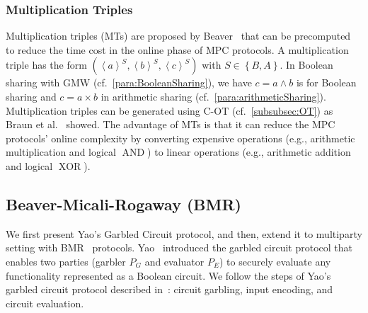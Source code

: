 \subsubsection{Multiplication Triples}
\label{subsubsec:MTs}
Multiplication triples (MTs) are proposed by Beaver~\cite{beaver1991efficient} that can be precomputed to reduce the time cost in the online phase of MPC protocols.
A multiplication triple has the form $\left(\left\langle a\right\rangle^S , \left\langle b\right\rangle^S,\left\langle c\right\rangle^S\right) $ with $S\in \left\{B,A\right\} $.
In Boolean sharing with GMW (cf.~\autoref{para:BooleanSharing}), we have $c=a\land b$ is for Boolean sharing  and $c=a \times  b$ in arithmetic sharing (cf.~\autoref{para:arithmeticSharing}).
Multiplication triples can be generated using C-OT (cf.~\autoref{subsubsec:OT}) as Braun et al.~\cite{DSZ15,braun2020motion} showed.
The advantage of MTs is that it can reduce the MPC protocols' online complexity by converting expensive operations (e.g., arithmetic multiplication and logical $\operatorname{AND}$) to linear operations (e.g., arithmetic addition and logical $\operatorname{XOR}$).




\subsection{Beaver-Micali-Rogaway (BMR)}
\label{subsec:BMR}

We first present Yao's Garbled Circuit protocol, and then, extend it to multiparty setting with BMR~\cite{beaver1990round} protocols.
Yao~\cite{Yao86} introduced the garbled circuit protocol that enables two parties (garbler $P_G$ and evaluator $P_E$) to securely evaluate any functionality represented as a Boolean circuit.
We follow the steps of Yao's garbled circuit protocol described in~\cite{lindell2009proof}: circuit garbling, input encoding, and circuit evaluation.


